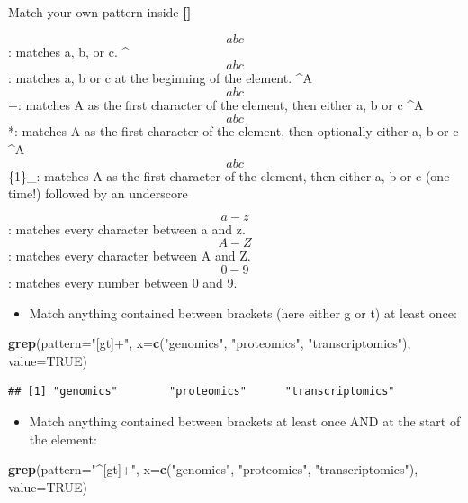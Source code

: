 \documentclass[]{book}
\newenvironment{Shaded}{\begin{snugshade}}{\end{snugshade}}
\newcommand{\DataTypeTok}[1]{\textcolor[rgb]{0.13,0.29,0.53}{#1}}
\newcommand{\KeywordTok}[1]{\textcolor[rgb]{0.13,0.29,0.53}{\textbf{#1}}}
\newcommand{\NormalTok}[1]{#1}
\newcommand{\OtherTok}[1]{\textcolor[rgb]{0.56,0.35,0.01}{#1}}
\newcommand{\StringTok}[1]{\textcolor[rgb]{0.31,0.60,0.02}{#1}}
\providecommand{\tightlist}{%
  \setlength{\itemsep}{0pt}\setlength{\parskip}{0pt}}
\begin{document}
Match your own pattern inside \textbf{{[}{]}}

\[abc\]: matches a, b, or c.
\^{}\[abc\]: matches a, b or c at the beginning of the element.
\^{}A\[abc\]+: matches A as the first character of the element, then either a, b or c
\^{}A\[abc\]*: matches A as the first character of the element, then optionally either a, b or c
\^{}A\[abc\]\{1\}\_: matches A as the first character of the element, then either a, b or c (one time!) followed by an underscore

\[a-z\]: matches every character between a and z.
\[A-Z\]: matches every character between A and Z.
\[0-9\]: matches every number between 0 and 9.

\begin{itemize}
\tightlist
\item
  Match anything contained between brackets (here either g or t) at least once:
\end{itemize}

\begin{Shaded}
\begin{Highlighting}[]
\KeywordTok{grep}\NormalTok{(}\DataTypeTok{pattern=}\StringTok{"[gt]+"}\NormalTok{, }
    \DataTypeTok{x=}\KeywordTok{c}\NormalTok{(}\StringTok{"genomics"}\NormalTok{, }\StringTok{"proteomics"}\NormalTok{, }\StringTok{"transcriptomics"}\NormalTok{), }
    \DataTypeTok{value=}\OtherTok{TRUE}\NormalTok{)}
\end{Highlighting}
\end{Shaded}

\begin{verbatim}
## [1] "genomics"        "proteomics"      "transcriptomics"
\end{verbatim}

\begin{itemize}
\tightlist
\item
  Match anything contained between brackets at least once AND at the start of the element:
\end{itemize}

\begin{Shaded}
\begin{Highlighting}[]
\KeywordTok{grep}\NormalTok{(}\DataTypeTok{pattern=}\StringTok{"^[gt]+"}\NormalTok{,}
        \DataTypeTok{x=}\KeywordTok{c}\NormalTok{(}\StringTok{"genomics"}\NormalTok{, }\StringTok{"proteomics"}\NormalTok{, }\StringTok{"transcriptomics"}\NormalTok{),}
        \DataTypeTok{value=}\OtherTok{TRUE}\NormalTok{)}
\end{Highlighting}
\end{Shaded}
\end{document}
